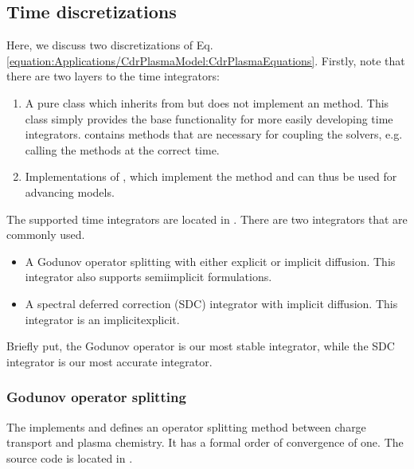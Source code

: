 \documentclass[letterpaper,10pt,english]{sphinxmanual}
\begin{document}
\subsection{Time discretizations}
\label{\detokenize{Applications/CdrPlasmaModel:time-discretizations}}
Here, we discuss two discretizations of Eq. \ref{equation:Applications/CdrPlasmaModel:CdrPlasmaEquations}.
Firstly, note that there are two layers to the time integrators:
\begin{enumerate}
%
\item {} 
A pure class  which inherits from  but does not implement an  method.
This class simply provides the base functionality for more easily developing time integrators.
 contains methods that are necessary for coupling the solvers, e.g. calling the  methods at the correct time.

\item {} 
Implementations of , which implement the  method and can thus be used for advancing models.

\end{enumerate}

The supported time integrators are located in .
There are two integrators that are commonly used.
\begin{itemize}
\item {} 
A Godunov operator splitting with either explicit or implicit diffusion.
This integrator also supports semi\sphinxhyphen{}implicit formulations.

\item {} 
A spectral deferred correction (SDC) integrator with implicit diffusion.
This integrator is an implicit\sphinxhyphen{}explicit.

\end{itemize}

Briefly put, the Godunov operator is our most stable integrator, while the SDC integrator is our most accurate integrator.


\subsubsection{Godunov operator splitting}
\label{\detokenize{Applications/CdrPlasmaModel:godunov-operator-splitting}}\label{\detokenize{Applications/CdrPlasmaModel:chap-godunov}}
The  implements  and defines an operator splitting method between charge transport and plasma chemistry.
It has a formal order of convergence of one.
The source code is located in .
\end{document}

